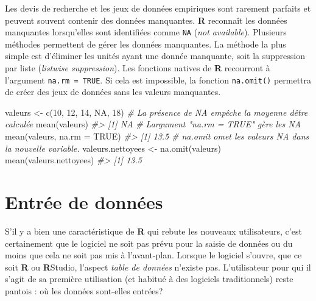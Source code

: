 \documentclass[
]{book}
\newenvironment{Shaded}{}{}
\newcommand{\AttributeTok}[1]{#1}
\newcommand{\CommentTok}[1]{\textit{#1}}
\newcommand{\ConstantTok}[1]{#1}
\newcommand{\DecValTok}[1]{#1}
\newcommand{\FunctionTok}[1]{#1}
\newcommand{\NormalTok}[1]{#1}
\newcommand{\OtherTok}[1]{#1}
\begin{document}
Les devis de recherche et les jeux de données empiriques sont rarement parfaits et peuvent souvent contenir des données manquantes. \textbf{R} reconnaît les données manquantes lorsqu'elles sont identifiées comme \texttt{NA} (\emph{not available}). Plusieurs méthodes permettent de gérer les données manquantes. La méthode la plus simple est d'éliminer les unités ayant une donnée manquante, soit la suppression par liste (\emph{listwise suppression}). Les fonctions natives de \textbf{R} recourront à l'argument \texttt{na.rm\ =\ TRUE}. Si cela est impossible, la fonction \texttt{na.omit()} permettra de créer des jeux de données sans les valeurs manquantes.

\begin{Shaded}
\begin{Highlighting}[]
\NormalTok{valeurs }\OtherTok{\textless{}{-}}  \FunctionTok{c}\NormalTok{(}\DecValTok{10}\NormalTok{, }\DecValTok{12}\NormalTok{, }\DecValTok{14}\NormalTok{, }\ConstantTok{NA}\NormalTok{, }\DecValTok{18}\NormalTok{)}
\CommentTok{\# La présence de NA empêche la moyenne d\textquotesingle{}être calculée}
\FunctionTok{mean}\NormalTok{(valeurs)}
\CommentTok{\#\textgreater{} [1] NA}
\CommentTok{\# L\textquotesingle{}argument "na.rm = TRUE" gère les NA}
\FunctionTok{mean}\NormalTok{(valeurs, }\AttributeTok{na.rm =} \ConstantTok{TRUE}\NormalTok{)}
\CommentTok{\#\textgreater{} [1] 13.5}
\CommentTok{\# na.omit omet les valeurs NA dans la nouvelle variable.}
\NormalTok{valeurs.nettoyees }\OtherTok{\textless{}{-}}  \FunctionTok{na.omit}\NormalTok{(valeurs)}
\FunctionTok{mean}\NormalTok{(valeurs.nettoyees)}
\CommentTok{\#\textgreater{} [1] 13.5}
\end{Highlighting}
\end{Shaded}

\hypertarget{entruxe9e-de-donnuxe9es}{%
\section{Entrée de données}\label{entruxe9e-de-donnuxe9es}}

S'il y a bien une caractéristique de \textbf{R} qui rebute les nouveaux utilisateurs, c'est certainement que le logiciel ne soit pas prévu pour la saisie de données ou du moins que cela ne soit pas mis à l'avant-plan. Lorsque le logiciel s'ouvre, que ce soit \textbf{R} ou \textbf{R}Studio, l'aspect \emph{table de données} n'existe pas. L'utilisateur pour qui il s'agit de sa première utilisation (et habitué à des logiciels traditionnels) reste pantois : où les données sont-elles entrées?
\end{document}
